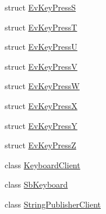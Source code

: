 \begin{DoxyCompactItemize}
\item 
struct \hyperlink{structdance__bot_1_1EvKeyPressS}{Ev\+Key\+PressS}
\item 
struct \hyperlink{structdance__bot_1_1EvKeyPressT}{Ev\+Key\+PressT}
\item 
struct \hyperlink{structdance__bot_1_1EvKeyPressU}{Ev\+Key\+PressU}
\item 
struct \hyperlink{structdance__bot_1_1EvKeyPressV}{Ev\+Key\+PressV}
\item 
struct \hyperlink{structdance__bot_1_1EvKeyPressW}{Ev\+Key\+PressW}
\item 
struct \hyperlink{structdance__bot_1_1EvKeyPressX}{Ev\+Key\+PressX}
\item 
struct \hyperlink{structdance__bot_1_1EvKeyPressY}{Ev\+Key\+PressY}
\item 
struct \hyperlink{structdance__bot_1_1EvKeyPressZ}{Ev\+Key\+PressZ}
\item 
class \hyperlink{classdance__bot_1_1KeyboardClient}{Keyboard\+Client}
\item 
class \hyperlink{classdance__bot_1_1SbKeyboard}{Sb\+Keyboard}
\item 
class \hyperlink{classdance__bot_1_1StringPublisherClient}{String\+Publisher\+Client}
\end{DoxyCompactItemize}
